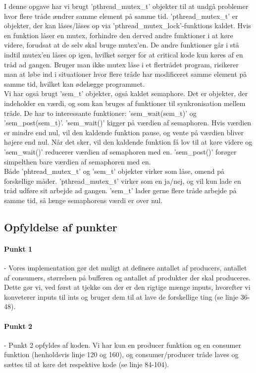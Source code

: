 I denne opgave har vi brugt 'pthread\_mutex\_t' objekter til at undgå problemer hvor flere tråde ændrer samme element på samme tid. 'pthread\_mutex\_t' er objekter, der kan låses/låses op via 'pthread\_mutex\_lock'-funktions kaldet. Hvis en funktion låser en mutex, forhindre den derved andre funktioner i at køre videre, forudsat at de selv skal bruge mutex'en. De andre funktioner går i stå indtil mutex'en låses op igen, hvilket sørger for at critical kode kun køres af en tråd ad gangen. Bruger man ikke mutex låse i et flertrådet program, risikerer man at løbe ind i situationer hvor flere tråde har modificeret samme element på samme tid, hvilket kan ødelægge programmet.
\\ Vi har også brugt 'sem\_t' objekter, også kaldet semaphore. Det er objekter, der indeholder en værdi, og som kan bruges af funktioner til synkronisation mellem tråde. De har to interessante funktioner: 'sem\_wait(sem\_t)' og 'sem\_post(sem\_t)'. 'sem\_wait()' kigger på værdien af semaphoren. Hvis værdien er mindre end nul, vil den kaldende funktion pause, og vente på værdien bliver højere end nul. Når det sker, vil den kaldende funktion få lov til at køre videre og 'sem\_wait()' reducerer værdien af semaphoren med en. 'sem\_post()' forøger simpelthen bare værdien af semaphoren med en.
\\ Både 'phtread\_mutex\_t' og 'sem\_t' objekter virker som låse, omend på forskellige måder. 'pthread\_mutex\_t' virker som en ja/nej, og vil kun lade en tråd udføre sit arbejde ad gangen. 'sem\_t' lader gerne flere tråde arbejde på samme tid, så længe semaphorens værdi er over nul.

\subsection{Opfyldelse af punkter}
\label{O3_Punkter}
\paragraph{Punkt 1} - Vores implementation gør det muligt at definere antallet af producers, antallet af consumers, størrelsen på bufferen og antallet af produkter der skal produceres. Dette gør vi, ved først at tjekke om der er den rigtige mænge inputs, hvorefter vi konveterer inputs til ints og bruger dem til at lave de forskellige ting (se linje 36-48).
\paragraph{Punkt 2} - Punkt 2 opfyldes af koden. Vi har kun en producer funktion og en consumer funktion (henholdsvis linje 120 og 160), og consumer/producer tråde laves og sættes til at køre det respektive kode (se linje 84-104).
